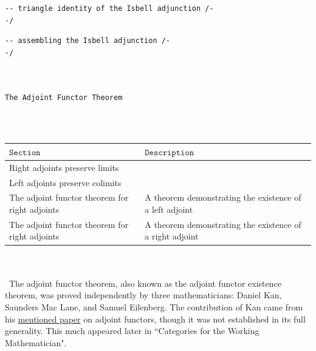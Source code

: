 \documentclass{book}
\theoremstyle{definition}
\newcounter{lcounter}
\renewcommand{\chapter}[1]{
\newpage
{
\Huge 
\begin{center}
\ \\
\ \\
\thispagestyle{empty}
\texttt{#1}
\end{center}}
\ \\
\ \\
}
\begin{document}
\begin{center}

 \begin{tcolorbox}[width=5in,colback={white},title={\begin{center}\texttt{Lean \thelcounter} \addtocounter{lcounter}{1} \end{center}},colbacktitle=Blue,coltitle=black] \begin{verbatim}
-- triangle identity of the Isbell adjunction /-
-/
\end{verbatim} \end{tcolorbox} \end{center}
\begin{center} \begin{tcolorbox}[width=5in,colback={white},title={\begin{center}\texttt{Lean \thelcounter} \addtocounter{lcounter}{1} \end{center}},colbacktitle=Blue,coltitle=black] \begin{verbatim}
-- assembling the Isbell adjunction /-
-/
\end{verbatim} \end{tcolorbox} \end{center}
\chapter{The Adjoint Functor Theorem}
{\footnotesize \begin{center} \begin{tabular}{|| l || l ||}
\hline
$\texttt{Section}$ & $\texttt{Description}$ \\
\hline
\hline
Right adjoints preserve limits & \\
\hline
Left adjoints preserve colimits & \\
\hline
The adjoint functor theorem for right adjoints & A theorem demonstrating the existence of a left adjoint \\

 \hline
The adjoint functor theorem for right adjoints & A theorem demonstrating the existence of a right adjoint \\
\hline
\end{tabular}
\end{center}} \\\
\\\
The adjoint functor theorem, also known as the adjoint functor existence theorem, was proved independently by three mathematicians: Daniel Kan, Saunders Mac Lane, and Samuel Eilenberg. The contribution of Kan came from his \href{https://www.ams.org/ journals/tran/1958-087-02/S0002-9947-1958-0131451-0/S0002-9947-1958-0131451-0.pdf } {mentioned paper} on adjoint functors, though it was not established in its full generality. This much appeared later in ``Categories for the Working Mathematician".\\
\end{document}
